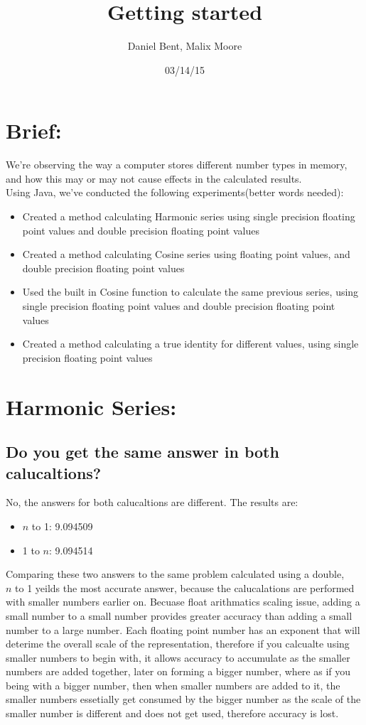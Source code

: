 \documentclass[12pt]{article}
\title{Getting started}
\author{Daniel Bent, Malix Moore}
\date{03/14/15}
\begin{document}
\maketitle

\section*{Brief:}
We’re observing the way a computer stores different number types in memory, and how this may or may not cause effects in the calculated results.\\
Using Java, we’ve conducted the following experiments(better words needed):

\begin{itemize}
  \item Created a method calculating Harmonic series using single precision floating point values and double precision floating point values
  \item Created a method calculating Cosine series using floating point values, and double precision floating point values
  \item Used the built in Cosine function to calculate the same previous series, using single precision floating point values and double precision floating point values
  \item Created a method calculating a true identity for different values, using single precision floating point values
\end{itemize}

\section*{Harmonic Series:}
\begin{itemize} 
\subsection*{Do you get the same answer in both calucaltions?}
\end{itemize}
\item No, the answers for both calucaltions are different. The results are:
\begin{itemize}
\item $n$ to 1: 9.094509
\item 1 to $n$: 9.094514
\end{itemize}
\item Comparing these two answers to the same problem calculated using a double,\\  $n$ to 1 yeilds the most accurate answer, because the calucalations are performed with smaller numbers earlier on. Becuase float arithmatics scaling issue, adding a small number to a small number provides greater accuracy than adding a small number to a large number. Each floating point number has an exponent that will deterime the overall scale of the representation, therefore if you calcualte using smaller numbers to begin with, it allows accuracy to accumulate as the smaller numbers are added together, later on forming a bigger number, where as if you being with a bigger number, then when smaller numbers are added to it, the smaller numbers essetially get consumed by the bigger number as the scale of the smaller number is different and does not get used, therefore accuracy is lost.
\end{document}

